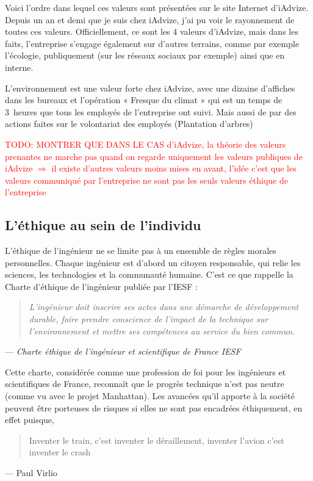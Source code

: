 \documentclass[12pt,a4paper]{report}
\begin{document}
Voici l'ordre dans lequel ces valeurs sont présentées sur le site Internet d'iAdvize. Depuis un an et demi que je suis chez iAdvize, j'ai pu voir le rayonnement de toutes ces valeurs. Officiellement, ce sont les 4 valeurs d'iAdvize, mais dans les faits, l'entreprise s'engage également sur d'autres terrains, comme par exemple l'écologie, publiquement (sur les réseaux sociaux par exemple) ainsi que en interne. 

L'environnement est une valeur forte chez iAdvize, avec une dizaine d'affiches dans les bureaux et l'opération « Fresque du climat » qui est un temps de 3~heures que tous les employés de l'entreprise ont suivi. Mais aussi de par des actions faites sur le volontariat des employés (Plantation d'arbres)

\textcolor{red}{TODO: MONTRER QUE DANS LE CAS d'iAdvize, la théorie des valeurs prenantes ne marche pas quand on regarde uniquement les valeurs publiques de iAdvize $\Rightarrow$ il existe d'autres valeurs moins mises en avant, l'idée c'est que les valeurs communiqué par l'entreprise ne sont pas les seuls valeurs éthique de l'entreprise}

\subsection{L'éthique au sein de l'individu}

L'éthique de l'ingénieur ne se limite pas à un ensemble de règles morales personnelles. Chaque ingénieur est d'abord un citoyen responsable, qui relie les sciences, les technologies et la communauté humaine. C'est ce que rappelle la Charte d'éthique de l'ingénieur publiée par l'IESF :

\begin{quote}
	\textit{L'ingénieur doit inscrire ses actes dans une démarche de développement durable, faire prendre conscience de l'impact de la technique sur l'environnement et mettre ses compétences au service du bien commun.}
\end{quote}
\hfill --- \textit{Charte éthique de l'ingénieur et scientifique de France IESF}

Cette charte, considérée comme une profession de foi pour les ingénieurs et scientifiques de France, reconnaît que le progrès technique n'est pas neutre (comme vu avec le projet Manhattan). Les avancées qu'il apporte à la société peuvent être porteuses de risques si elles ne sont pas encadrées éthiquement, en effet puisque,
\begin{quote}
Inventer le train, c'est inventer le déraillement, inventer l'avion c'est inventer le crash
\end{quote}
\hfill --- Paul Virlio
\end{document}
